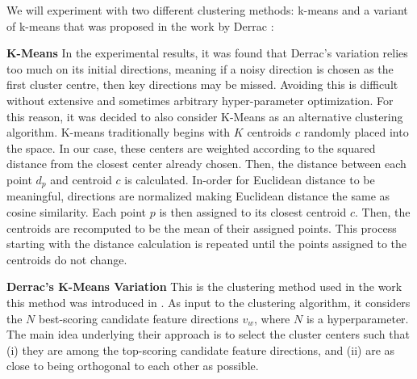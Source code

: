



We will experiment with two different clustering methods: k-means and a variant of k-means that was proposed in the work by Derrac \cite{Derrac2015}:

\noindent \textbf{K-Means} In the experimental results, it was found that Derrac's variation relies too much on its initial directions, meaning if a noisy direction is chosen as the first cluster centre, then key directions may be missed. Avoiding this is difficult without extensive and sometimes arbitrary hyper-parameter optimization. For this reason, it was decided to also consider K-Means as an alternative clustering algorithm. K-means traditionally begins with $K$ centroids $c$ randomly placed into the space. In our case, these centers are weighted according to the squared distance from the closest center already chosen. \cite{Arthur} %
Then, the distance between each point $d_p$ and centroid $c$ is calculated. In-order for Euclidean distance to be meaningful, directions are normalized making Euclidean   distance the same as cosine similarity. Each point $p$ is then assigned to its closest centroid $c$. Then, the centroids are recomputed to be the mean of their assigned points. This process starting with the distance calculation is repeated until the points assigned to the centroids do not change. 

\noindent \textbf{Derrac's K-Means Variation} This is the clustering method used in the work this method was introduced in \cite{derrac2015}. As input to the clustering algorithm, it considers the $N$ best-scoring candidate feature directions $v_w$, where $N$ is a hyperparameter. The main idea underlying their approach is to select the cluster centers such that (i) they are among the top-scoring candidate feature directions, and (ii) are as close to being orthogonal to each other as possible. 
 
